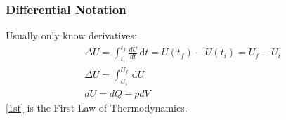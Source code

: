 \documentclass[12pt]{article}
\theoremstyle{definition} %
\theoremstyle{plain} %
\begin{document}
\subsubsection*{Differential Notation}

Usually only know derivatives:
\begin{align}
    \Delta U = \int_{t_{i}}^{t_{f}} \frac{dU}{dt} \,\mathrm{d}t = U(t_{f})- U(t_{i})= U_{f}-U_{i}\\[10pt] 
    \Delta U = \int_{U_{i}}^{U_{f}}  \,\mathrm{d}U \\[10pt] 
    dU = dQ - pdV \label{1st}
\end{align}
\autoref{1st} is the First Law of Thermodynamics.
\end{document}
